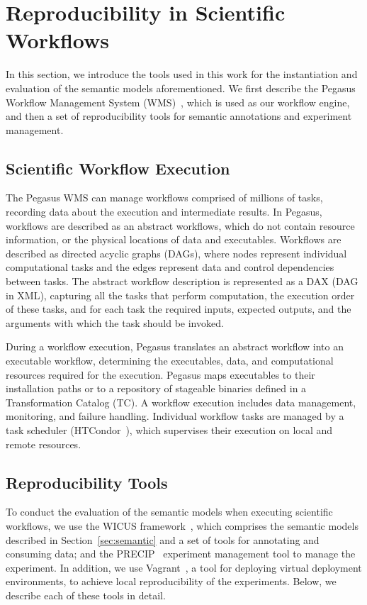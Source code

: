 \section{Reproducibility in Scientific Workflows}
\label{sec:reproducibility}

In this section, we introduce the tools used in this work for the instantiation and evaluation 
of the semantic models aforementioned. We first describe the Pegasus Workflow 
Management System (WMS)~\cite{Pegasus, Deelman-FGCS-2014}, which is used as our 
workflow engine, and then a set of reproducibility tools for semantic annotations and 
experiment management.


\subsection{Scientific Workflow Execution}

The Pegasus WMS can manage workflows comprised of millions of tasks, recording data 
about the execution and intermediate results. In Pegasus, workflows are described as an 
abstract workflows, which do not contain resource information, or the physical locations of 
data and executables. Workflows are described as directed acyclic graphs (DAGs), where 
nodes represent individual computational tasks and the edges represent data and control 
dependencies between tasks. The abstract workflow description is represented as a DAX 
(DAG in XML), capturing all the tasks that perform computation, the execution order of these 
tasks, and for each task the required inputs, expected outputs, and the arguments with which 
the task should be invoked. 

During a workflow execution, Pegasus translates an abstract workflow into an 
executable workflow, determining the executables, data, and computational resources 
required for the execution. Pegasus maps executables to their installation paths or to a 
repository of stageable binaries defined in a Transformation Catalog (TC). A workflow 
execution includes data management, monitoring, and failure handling. Individual workflow 
tasks are managed by a task scheduler (HTCondor~\cite{condor}), which supervises their 
execution on local and remote resources.


\subsection{Reproducibility Tools}

To conduct the evaluation of the semantic models when executing scientific workflows, we 
use the WICUS framework~\cite{wicus}, which comprises the semantic models described 
in Section~\ref{sec:semantic} and a set of tools for annotating and consuming data; and 
the PRECIP~\cite{Azarnoosh-CRC-2013} experiment management tool to manage the 
experiment. In addition, we use Vagrant~\cite{palat2012introducing}, a tool for deploying virtual
deployment environments,  to achieve local reproducibility of the experiments. 
Below, we describe each of these tools in detail.


